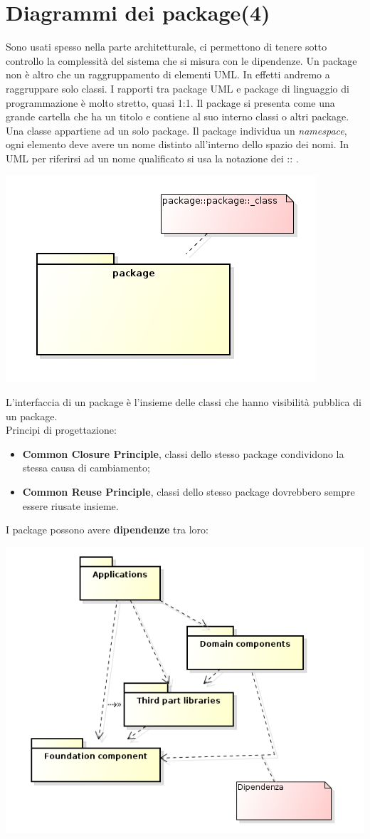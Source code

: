 



\section{Diagrammi dei package(4)}

Sono usati spesso nella parte architetturale, ci permettono di tenere sotto controllo la complessità del sistema che si misura con le dipendenze. Un package non è altro che un raggruppamento di elementi UML. In effetti andremo a raggruppare solo classi. I rapporti tra package UML e package di linguaggio di programmazione è molto stretto, quasi 1:1. Il package si presenta come una grande cartella che ha un titolo e contiene al suo interno classi o altri package. Una classe appartiene ad un solo package. Il package individua un \textit{namespace}, ogni elemento deve avere un nome distinto all'interno dello spazio dei nomi. In UML per riferirsi ad un nome qualificato si usa la notazione dei :: .

\includegraphics[width=0.3\columnwidth]{img2} %

L'interfaccia di un package è l'insieme delle classi che hanno visibilità pubblica di un package.\\
Principi di progettazione:

\begin{itemize}

	\item \textbf{Common Closure Principle}, classi dello stesso package condividono la stessa causa di cambiamento;
	\item \textbf{Common Reuse Principle}, classi dello stesso package dovrebbero sempre essere riusate insieme.

\end{itemize}

I package possono avere \textbf{dipendenze} tra loro:

\includegraphics[width=0.5\columnwidth]{img3} %

